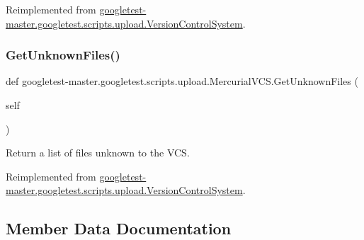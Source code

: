 Reimplemented from \mbox{\hyperlink{classgoogletest-master_1_1googletest_1_1scripts_1_1upload_1_1_version_control_system_adfc913d49e48291939a9de8476a4c993}{googletest-\/master.\+googletest.\+scripts.\+upload.\+Version\+Control\+System}}.

\mbox{\label{classgoogletest-master_1_1googletest_1_1scripts_1_1upload_1_1_mercurial_v_c_s_a16c601bb13f3ae9b6f54239969f37095}} 
\subsubsection{\texorpdfstring{GetUnknownFiles()}{GetUnknownFiles()}}
{\footnotesize\ttfamily def googletest-\/master.\+googletest.\+scripts.\+upload.\+Mercurial\+V\+C\+S.\+Get\+Unknown\+Files (\begin{DoxyParamCaption}\item[{}]{self }\end{DoxyParamCaption})}

\begin{DoxyVerb}Return a list of files unknown to the VCS.\end{DoxyVerb}
 

Reimplemented from \mbox{\hyperlink{classgoogletest-master_1_1googletest_1_1scripts_1_1upload_1_1_version_control_system_aef7e59b815e037806eb11d94ed512ba6}{googletest-\/master.\+googletest.\+scripts.\+upload.\+Version\+Control\+System}}.



\subsection{Member Data Documentation}
\mbox{\label{classgoogletest-master_1_1googletest_1_1scripts_1_1upload_1_1_mercurial_v_c_s_a72b4384769bcbca15146d0482fff4514}} 

